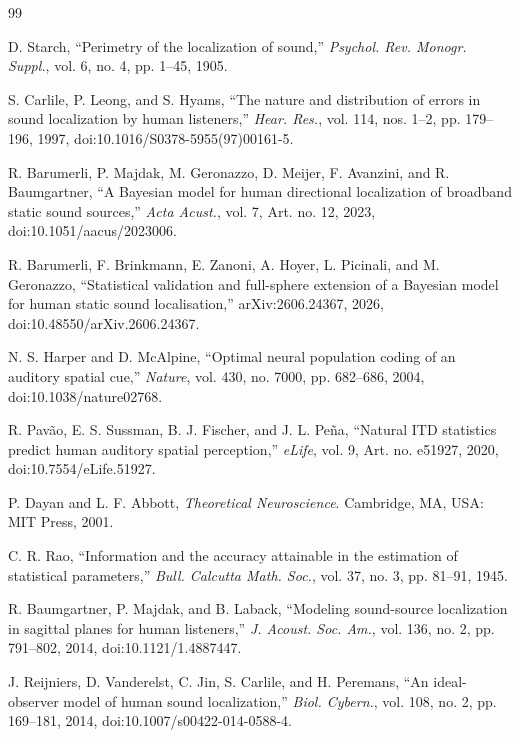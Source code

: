 \documentclass[journal]{IEEEtran}
\begin{document}
\FloatBarrier
\begingroup
\footnotesize
\setlength{\itemsep}{0pt}
\setlength{\parsep}{0pt}
\begin{thebibliography}{99}

D. Starch, ``Perimetry of the localization of sound,'' \textit{Psychol. Rev. Monogr. Suppl.}, vol. 6, no. 4, pp. 1--45, 1905.

S. Carlile, P. Leong, and S. Hyams, ``The nature and distribution of errors in sound localization by human listeners,'' \textit{Hear. Res.}, vol. 114, nos. 1--2, pp. 179--196, 1997, doi:10.1016/S0378-5955(97)00161-5.

R. Barumerli, P. Majdak, M. Geronazzo, D. Meijer, F. Avanzini, and R. Baumgartner, ``A Bayesian model for human directional localization of broadband static sound sources,'' \textit{Acta Acust.}, vol. 7, Art. no. 12, 2023, doi:10.1051/aacus/2023006.

R. Barumerli, F. Brinkmann, E. Zanoni, A. Hoyer, L. Picinali, and M. Geronazzo, ``Statistical validation and full-sphere extension of a Bayesian model for human static sound localisation,'' arXiv:2606.24367, 2026, doi:10.48550/arXiv.2606.24367.

N. S. Harper and D. McAlpine, ``Optimal neural population coding of an auditory spatial cue,'' \textit{Nature}, vol. 430, no. 7000, pp. 682--686, 2004, doi:10.1038/nature02768.

R. Pav\~ao, E. S. Sussman, B. J. Fischer, and J. L. Pe\~na, ``Natural ITD statistics predict human auditory spatial perception,'' \textit{eLife}, vol. 9, Art. no. e51927, 2020, doi:10.7554/eLife.51927.

P. Dayan and L. F. Abbott, \textit{Theoretical Neuroscience}. Cambridge, MA, USA: MIT Press, 2001.

C. R. Rao, ``Information and the accuracy attainable in the estimation of statistical parameters,'' \textit{Bull. Calcutta Math. Soc.}, vol. 37, no. 3, pp. 81--91, 1945.

R. Baumgartner, P. Majdak, and B. Laback, ``Modeling sound-source localization in sagittal planes for human listeners,'' \textit{J. Acoust. Soc. Am.}, vol. 136, no. 2, pp. 791--802, 2014, doi:10.1121/1.4887447.

J. Reijniers, D. Vanderelst, C. Jin, S. Carlile, and H. Peremans,
``An ideal-observer model of human sound localization,''
\textit{Biol. Cybern.}, vol. 108, no. 2, pp. 169--181, 2014, doi:10.1007/s00422-014-0588-4.


\end{thebibliography}
\end{document}

